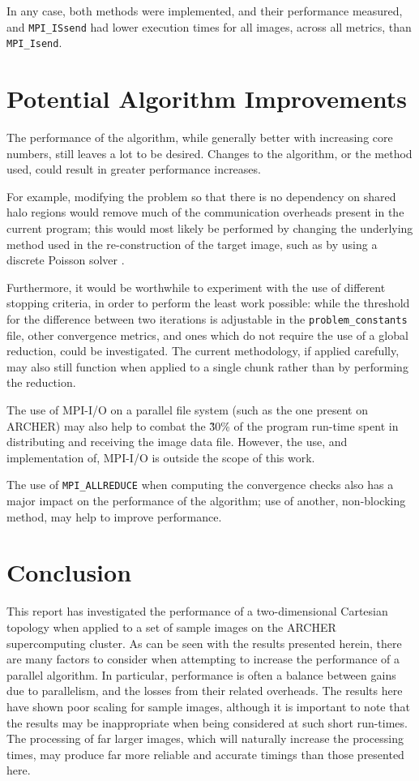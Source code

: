 \documentclass{article} %
\newcommand{\tp}{\texttt}
\begin{document}
\noindent In any case, both methods were implemented, and their performance measured, and \tp{MPI\_ISsend} had lower execution times for all images, across all metrics, than \tp{MPI\_Isend}.

\section*{Potential Algorithm Improvements}

The performance of the algorithm, while generally better with increasing core numbers, still leaves a lot to be desired.
Changes to the algorithm, or the method used, could result in greater performance increases.

For example, modifying the problem so that there is no dependency on shared halo regions would remove much of the communication overheads present in the current program; this would most likely be performed by changing the underlying method used in the re-construction of the target image, such as by using a discrete Poisson solver \citep{Perez2016}.

Furthermore, it would be worthwhile to experiment with the use of different stopping criteria, in order to perform the least work possible: while the threshold for the difference between two iterations is adjustable in the \tp{problem\_constants} file, other convergence metrics, and ones which do not require the use of a global reduction, could be investigated. The current methodology, if applied carefully, may also still function when applied to a single chunk rather than by performing the reduction.

The use of MPI-I/O on a parallel file system (such as the one present on ARCHER) may also help to combat the \~30\% of the program run-time spent in distributing and receiving the image data file.
However, the use, and implementation of, MPI-I/O is outside the scope of this work.

The use of \tp{MPI\_ALLREDUCE} when computing the convergence checks also has a major impact on the performance of the algorithm; use of another, non-blocking method, may help to improve performance.

\section*{Conclusion}

This report has investigated the performance of a two-dimensional Cartesian topology when applied to a set of sample images on the ARCHER supercomputing cluster. As can be seen with the results presented herein, there are many factors to consider when attempting to increase the performance of a parallel algorithm. In particular, performance is often a balance between gains due to parallelism, and the losses from their related overheads. The results here have shown poor scaling for sample images, although it is important to note that the results may be inappropriate when being considered at such short run-times. The processing of far larger images, which will naturally increase the processing times, may produce far more reliable and accurate timings than those presented here.



\end{document}
